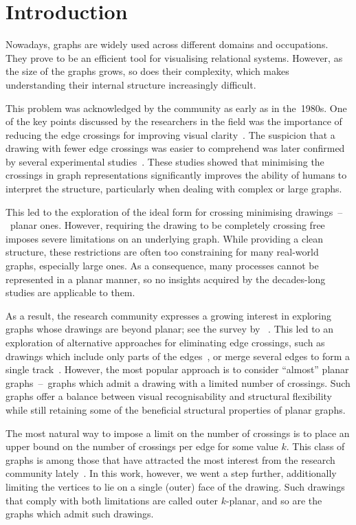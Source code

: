 \chapter{Introduction}\label{ch:introduction}

Nowadays, graphs are widely used across different domains and occupations. They prove to be an efficient tool for visualising relational systems. However, as the size of the graphs grows, so does their complexity, which makes understanding their internal structure increasingly difficult.

This problem was acknowledged by the community as early as in the~1980s. One of the key points discussed by the researchers in the field was the importance of reducing the edge crossings for improving visual clarity~\cite{early-few-crossing}. The suspicion that a drawing with fewer edge crossings was easier to comprehend was later confirmed by several experimental studies~\cite{graph-aesthetic-survey}. These studies showed that minimising the crossings in graph representations significantly improves the ability of humans to interpret the structure, particularly when dealing with complex or large graphs.

This led to the exploration of the ideal form for crossing minimising drawings~--~planar ones. However, requiring the drawing to be completely crossing free imposes severe limitations on an underlying graph. While providing a clean structure, these restrictions are often too constraining for many real-world graphs, especially large ones. As a consequence, many processes cannot be represented in a planar manner, so no insights acquired by the decades-long studies are applicable to them.

As a result, the research community expresses a growing interest in exploring graphs whose drawings are beyond planar; see the survey by \citeauthor{beyond-planarity-survey}~\cite{beyond-planarity-survey}. This led to an exploration of alternative approaches for eliminating edge crossings, such as drawings which include only parts of the edges~\cite{break-the-edge,break-the-edge2}, or merge several edges to form a single track~\cite{confluent-drawings}. However, the most popular approach is to consider ``almost'' planar graphs~--~graphs which admit a drawing with a limited number of crossings. Such graphs offer a balance between visual recognisability and structural flexibility while still retaining some of the beneficial structural properties of planar graphs.

The most natural way to impose a limit on the number of crossings is to place an upper bound on the number of crossings per edge for some value \(k\). This class of graphs is among those that have attracted the most interest from the research community lately~\cite{contest}. In this work, however, we went a step further, additionally limiting the vertices to lie on a single (outer) face of the drawing. Such drawings that comply with both limitations are called outer \(k\)-planar, and so are the graphs which admit such drawings.


